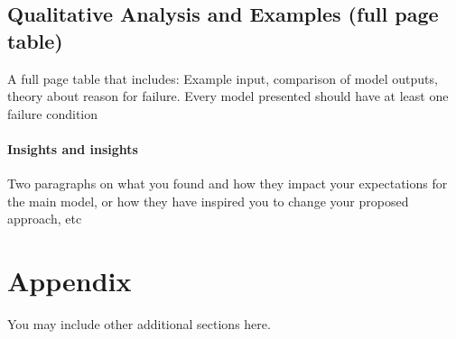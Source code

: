 \documentclass{article} %
\begin{document}
\clearpage
\subsection{ Qualitative Analysis and Examples (full page table)}
 A full page table that includes: Example input, comparison of model outputs, theory about reason for failure. Every model presented should have at least one failure condition

\paragraph{ Insights and insights}
Two paragraphs on what you found and how they impact your expectations for the main model, or how they have inspired you to change your proposed approach, etc





\appendix
\section{Appendix}
You may include other additional sections here.
\end{document}
